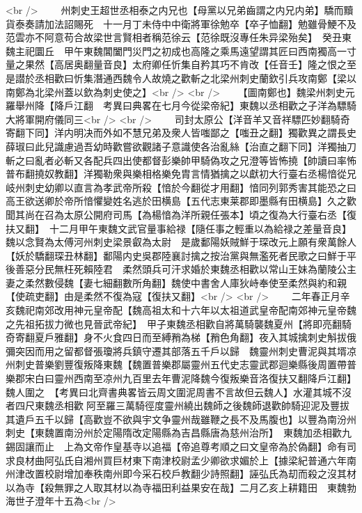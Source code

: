 <br />
　　州刺史王超世丞相泰之内兄也【母黨以兄弟齒謂之内兄内弟】驕而黷貨泰奏請加法詔賜死　十一月丁未侍中中衛將軍徐勉卒【卒子恤翻】勉雖骨鯁不及范雲亦不阿意苟合故梁世言賢相者稱范徐云【范徐既沒專任朱异梁殆矣】　癸丑東魏主祀圜丘　甲午東魏閶闔門災門之初成也高隆之乘馬遠望謂其匠曰西南獨高一寸量之果然【高居奥翻量音良】太府卿任忻集自矜其巧不肯改【任音壬】隆之恨之至是譛於丞相歡曰忻集潛通西魏令人故燒之歡斬之北梁州刺史蘭欽引兵攻南鄭【梁以南鄭為北梁州蓋以欽為刺史使之】<br />
<br />
　　【圖南鄭也】魏梁州刺史元羅舉州降【降戶江翻　考異曰典畧在七月今從梁帝紀】東魏以丞相歡之子洋為驃騎大將軍開府儀同三<br />
<br />
　　司封太原公【洋音羊又音祥驃匹妙翻騎奇寄翻下同】洋内明决而外如不慧兄弟及衆人皆嗤鄙之【嗤丑之翻】獨歡異之謂長史薛琡曰此兒識慮過吾幼時歡嘗欲觀諸子意識使各治亂絲【治直之翻下同】洋獨抽刀斬之曰亂者必斬又各配兵四出使都督彭樂帥甲騎偽攻之兄澄等皆怖撓【帥讀曰率怖普布翻撓奴教翻】洋獨勒衆與樂相格樂免胄言情猶擒之以獻初大行臺右丞楊愔從兄岐州刺史幼卿以直言為孝武帝所殺【愔於今翻從才用翻】愔同列郭秀害其能恐之曰高王欲送卿於帝所愔懼變姓名逃於田横島【五代志東莱郡即墨縣有田横島】久之歡聞其尚在召為太原公開府司馬【為楊愔為洋所親任張本】頃之復為大行臺右丞【復扶又翻】　十二月甲午東魏文武官量事給禄【隨任事之輕重以為給禄之差量音良】　魏以念賢為太傅河州刺史梁景叡為太尉　是歲鄱陽妖賊鮮于琛改元上願有衆萬餘人【妖於驕翻琛丑林翻】鄱陽内史吳郡陸襄討擒之按治黨與無濫死者民歌之曰鮮于平後善惡分民無枉死賴陸君　柔然頭兵可汗求婚於東魏丞相歡以常山王妹為蘭陵公主妻之柔然數侵魏【妻七細翻數所角翻】魏使中書舍人庫狄峙奉使至柔然與約和親【使疏吏翻】由是柔然不復為寇【復扶又翻】<br />
<br />
　　二年春正月辛亥魏祀南郊改用神元皇帝配【魏高祖太和十六年以太祖道武皇帝配南郊神元皇帝魏之先祖拓拔力微也見晉武帝紀】　甲子東魏丞相歡自將萬騎襲魏夏州【將即亮翻騎奇寄翻夏戶雅翻】身不火食四日而至縛矟為梯【矟色角翻】夜入其城擒刺史斛拔俄彌突因而用之留都督張瓊將兵鎮守遷其部落五千戶以歸　魏靈州刺史曹泥與其壻凉州刺史普樂劉豐復叛降東魏【魏置普樂郡屬靈州五代史志靈武郡迴樂縣後周置帶普樂郡宋白曰靈州西南至凉州九百里去年曹泥降魏今復叛樂音洛復扶又翻降戶江翻】魏人圍之　【考異曰北齊書典畧皆云周文圍泥周書不言故但云魏人】水灌其城不沒者四尺東魏丞相歡阿至羅三萬騎徑度靈州繞出魏師之後魏師退歡帥騎迎泥及豐拔其遺戶五千以歸【高歡豈不欲與宇文争靈州哉雖鞭之長不及馬腹也】以豐為南汾州刺史【東魏置南汾州於定陽隋改定陽縣為吉昌縣唐為慈州治所】　東魏加丞相歡九錫固讓而止　上為文帝作皇基寺以追福【帝追尊考順之曰文皇帝為於偽翻】命有司求良材曲阿弘氏自湘州買巨材東下南津校尉孟少卿欲求媚於上【據梁紀普通六年南州津改置校尉增加奉秩南州即今采石校戶教翻少詩照翻】誣弘氏為刧而殺之沒其材以為寺【殺無罪之人取其材以為寺福田利益果安在哉】二月乙亥上耕籍田　東魏勃海世子澄年十五為<br />
